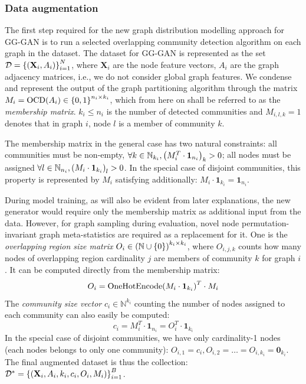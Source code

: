 \subsubsection{Data augmentation}
The first step required for the new graph distribution modelling approach for GG-GAN is to run a selected overlapping community detection algorithm on each graph in the dataset. The dataset for GG-GAN is represented as the set $\mathcal{D} = \mathopen{}\left\{\mathopen{}\left(\mathbf{X}_i, A_i\right)\right\}_{i=1}^{N}$, where $\mathbf{X}_i$ are the node feature vectors, $A_i$ are the graph adjacency matrices, i.e., we do not consider global graph features. We condense and represent the output of the graph partitioning algorithm through the matrix $M_i = \text{OCD}\mathopen{}\left(A_i\right) \in \mathopen{}\left\{0, 1\right\}^{n_i \times k_i}$, which from here on shall be referred to as the \emph{membership matrix}. $k_i \leq n_i$ is the number of detected communities and $M_{i,l,k}=1$ denotes that in graph $i$, node $l$ is a member of community $k$.

The membership matrix in the general case has two natural constraints: all communities must be non-empty, $\forall k \in \mathbb{N}_{k_i}, \mathopen{}\left(M^T_i \cdot \mathbf{1}_{n_i}\right)_k > 0$; all nodes must be assigned $\forall l \in \mathbb{N}_{n_i}, \mathopen{}\left(M_i \cdot \mathbf{1}_{k_i}\right)_l > 0$. In the special case of disjoint communities, this property is represented by $M_i$ satisfying additionally: $M_i \cdot \mathbf{1}_{k_i} = \mathbf{1}_{n_i}$.

During model training, as will also be evident from later explanations, the new generator would require only the membership matrix as additional input from the data. However, for graph sampling during evaluation, novel node permutation-invariant graph meta-statistics are required as a replacement for it. One is the \emph{overlapping region size matrix} $O_i \in \mathopen{}\left(\mathbb{N}\cup\mathopen{}\left\{0\right\}\right)^{k_i \times k_i}$, where $O_{i,j,k}$ counts how many nodes of overlapping region cardinality $j$ are members of community $k$ for graph $i$. It can be computed directly from the membership matrix:
\begin{equation}
O_i = \text{OneHotEncode}\mathopen{}\left(M_i \cdot \mathbf{1}_{k_i}\right)^T \cdot M_i
\end{equation}
The \emph{community size vector} $c_i \in \mathbb{N}^{k_i}$ counting the number of nodes assigned to each community can also easily be computed: 
\begin{equation}
c_i = M^T_i \cdot \mathbf{1}_{n_i} = O_i^T \cdot \mathbf{1}_{k_i}
\end{equation}
In the special case of disjoint communities, we have only cardinality-1 nodes (each nodes belongs to only one community): $O_{i,1}=c_i, O_{i,2}=\dots=O_{i,k_i}=\mathbf{0}_{k_i}$.
The final augmented dataset is thus the collection: $\mathcal{D}^* = \mathopen{}\left\{\mathopen{}\left(\mathbf{X}_i, A_i, k_i, c_i, O_i, M_i\right)\right\}_{i=1}^{B}$.

